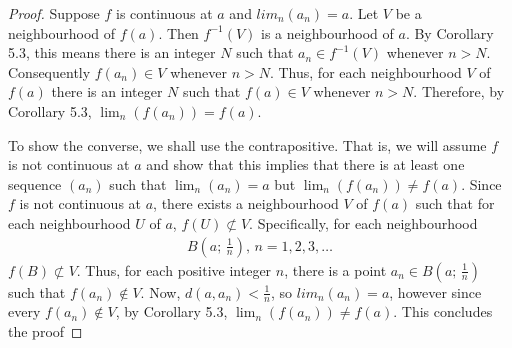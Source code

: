 \documentclass{article}
\begin{document}
\begin{proof}
    Suppose $f$ is continuous at $a$ and $lim_n(a_n) = a$. Let $V$ be a neighbourhood of $f(a)$. Then $f^{-1}(V)$ is a neighbourhood of $a$.
    By Corollary 5.3, this means there is an integer $N$ such that $a_n \in f^{-1}(V)$ whenever $n > N$. Consequently $f(a_n) \in V$ whenever $n > N$.
    Thus, for each neighbourhood $V$ of $f(a)$ there is an integer $N$ such that $f(a) \in V$ whenever $n > N$. Therefore, by Corollary 5.3, $\lim_n(f(a_n)) = f(a)$.

    To show the converse, we shall use the contrapositive. That is, we will assume $f$ is not continuous at $a$ and show that this implies that there is at least
    one sequence $(a_n)$ such that $\lim_n(a_n) = a$ but $\lim_n(f(a_n)) \ne f(a)$. Since $f$ is not continuous at $a$, there exists a neighbourhood $V$ of $f(a)$ such
    that for each neighbourhood $U$ of $a$, $f(U) \not \subset V$. Specifically, for each neighbourhood
    \begin{align*}
        B\left(a;\,\frac{1}{n}\right),\,n = 1, 2, 3, \dots
    \end{align*}
    $f(B) \not \subset V$. Thus, for each positive integer $n$, there is a point $a_n \in  B\left(a;\,\frac{1}{n}\right)$
    such that $f(a_n) \notin V$. Now, $d(a, a_n) < \frac{1}{n}$, so $lim_n(a_n) = a$, however since every
    $f(a_n) \notin V$, by Corollary 5.3, $\lim_n(f(a_n)) \ne f(a)$. This concludes the proof
\end{proof}
\end{document}
